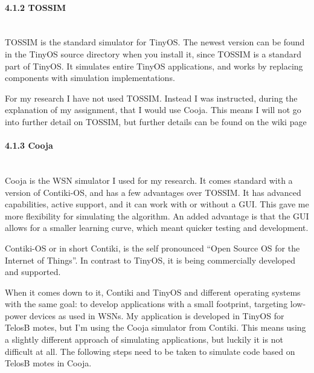 \paragraph{4.1.2 TOSSIM\\\\}\label{tossim}

TOSSIM is the standard simulator for TinyOS. The newest version can be
found in the TinyOS source directory when you install it, since TOSSIM
is a standard part of TinyOS. It simulates entire TinyOS applications,
and works by replacing components with simulation
implementations\cite{levis2003tossim}.

For my research I have not used TOSSIM. Instead I was instructed, during
the explanation of my assignment, that I would use Cooja. This means I
will not go into further detail on TOSSIM, but further details can be
found on the wiki page

\paragraph{4.1.3 Cooja\\\\}\label{cooja}

Cooja is the WSN simulator I used for my research. It comes standard
with a version of Contiki-OS, and has a few advantages over TOSSIM. It
has advanced capabilities, active support, and it can work with or
without a GUI\cite{osterlind2006cross}\cite{eriksson2009cooja}. This
gave me more flexibility for simulating the algorithm. An added
advantage is that the GUI allows for a smaller learning curve, which
meant quicker testing and development.

Contiki-OS or in short Contiki, is the self pronounced ``Open Source OS
for the Internet of Things''. In contrast to TinyOS, it is being
commercially developed and supported\cite{dunkels2004contiki}.

When it comes down to it, Contiki and TinyOS and different operating
systems with the same goal: to develop applications with a small
footprint, targeting low-power devices as used in
WSNs\cite{reusing2012comparison}. My application is developed in TinyOS
for TelosB motes, but I'm using the Cooja simulator from Contiki. This
means using a slightly different approach of simulating applications,
but luckily it is not difficult at all. The following steps need to be
taken to simulate code based on TelosB motes in Cooja.

